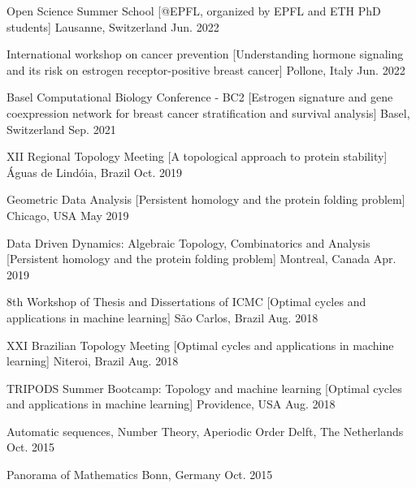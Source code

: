 \begin{cvhonors}

\cvhonor
  {Open Science Summer School}
  [@EPFL, organized by EPFL and ETH PhD students]
  {Lausanne, Switzerland}
  {Jun. 2022}


\cvhonor
  {International workshop on cancer prevention} %
  [Understanding hormone signaling and its risk on estrogen receptor-positive breast cancer] %
  {Pollone, Italy} %
  {Jun. 2022} %

\cvhonor
  {Basel Computational Biology Conference - BC2} %
  [Estrogen signature and gene coexpression network for breast cancer stratification and survival analysis] %
  {Basel, Switzerland} %
  {Sep. 2021} %


\cvhonor
  {XII Regional Topology Meeting} %
  [A topological approach to protein stability] %
  {Águas de Lindóia, Brazil} %
  {Oct. 2019} %


\cvhonor
  {Geometric Data Analysis} %
  [Persistent homology and the protein folding problem] %
  {Chicago, USA} %
  {May 2019} %

\cvhonor
  {Data Driven Dynamics: Algebraic Topology, Combinatorics and Analysis} %
  [Persistent homology and the protein folding problem] %
  {Montreal, Canada} %
  {Apr. 2019} %

\cvhonor
  {8th Workshop of Thesis and Dissertations of ICMC} %
  [Optimal cycles and applications in machine learning] %
  {São Carlos, Brazil} %
  {Aug. 2018} %

\cvhonor
  {XXI Brazilian Topology Meeting} %
  [Optimal cycles and applications in machine learning] %
  {Niteroi, Brazil} %
  {Aug. 2018} %

\cvhonor
  {TRIPODS Summer Bootcamp: Topology and machine learning} %
  [Optimal cycles and applications in machine learning] %
  {Providence, USA} %
  {Aug. 2018} %

\cvhonor
  {Automatic sequences, Number Theory, Aperiodic Order} %
  {Delft, The Netherlands} %
  {Oct. 2015} %

\cvhonor
  {Panorama of Mathematics} %
  {Bonn, Germany} %
  {Oct. 2015} %

\end{cvhonors}
